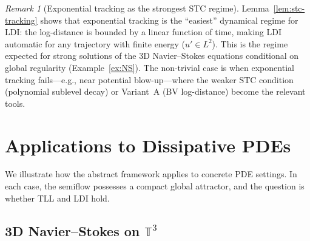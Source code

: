 \documentclass[12pt,a4paper]{article}
\theoremstyle{definition}
\theoremstyle{plain}
\theoremstyle{remark}
\newtheorem{remark}[definition]{Remark}
\begin{document}
\begin{remark}[Exponential tracking as the strongest STC regime]
\label{rem:exp-tracking-strongest}
Lemma~\ref{lem:stc-tracking} shows that exponential tracking is
the ``easiest'' dynamical regime for LDI: the log-distance is
bounded by a linear function of time, making LDI automatic for
any trajectory with finite energy ($u' \in L^2$).
This is the regime expected for strong solutions of the
3D Navier--Stokes equations conditional on global regularity
(Example~\ref{ex:NS}).  The non-trivial case is when
exponential tracking fails---e.g., near potential blow-up---where
the weaker STC condition (polynomial sublevel decay) or
Variant~A (BV log-distance) become the relevant tools.
\end{remark}


\section{Applications to Dissipative PDEs}
\label{sec:applications}

We illustrate how the abstract framework applies to concrete
PDE settings.  In each case, the semiflow possesses a compact
global attractor, and the question is whether TLL and LDI hold.

\subsection{3D Navier--Stokes on $\mathbb{T}^3$}
\end{document}
